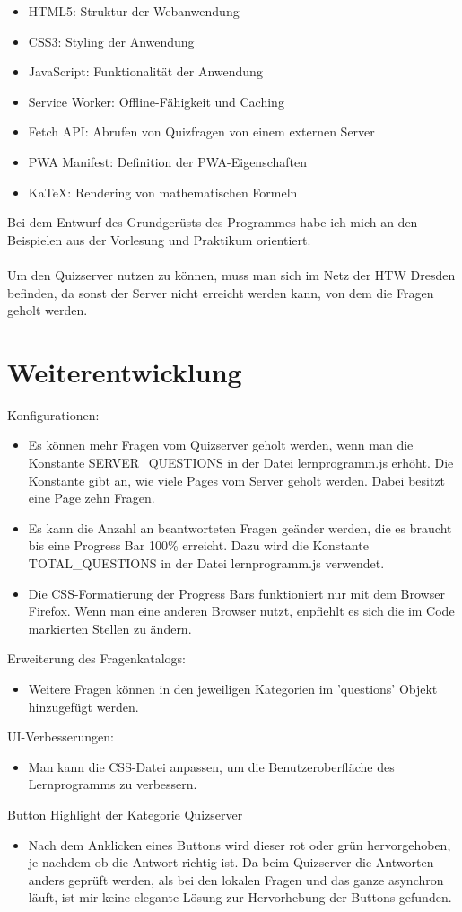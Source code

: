 \documentclass{article}
\begin{document}
\begin{itemize}
  \item HTML5: Struktur der Webanwendung
  \item CSS3: Styling der Anwendung
  \item JavaScript: Funktionalität der Anwendung
  \item Service Worker: Offline-Fähigkeit und Caching
  \item Fetch API: Abrufen von Quizfragen von einem externen Server
  \item PWA Manifest: Definition der PWA-Eigenschaften
  \item KaTeX: Rendering von mathematischen Formeln
\end{itemize}
Bei dem Entwurf des Grundgerüsts des Programmes habe ich mich an den Beispielen aus der Vorlesung und Praktikum orientiert.\\\\
Um den Quizserver nutzen zu können, muss man sich im Netz der HTW Dresden befinden, da sonst der Server nicht erreicht werden
kann, von dem die Fragen geholt werden.
\newpage

\section{Weiterentwicklung}
Konfigurationen:
\begin{itemize}
  \item Es können mehr Fragen vom Quizserver geholt werden, wenn man die Konstante SERVER\_QUESTIONS in der Datei lernprogramm.js erhöht.
  Die Konstante gibt an, wie viele Pages vom Server geholt werden. Dabei besitzt eine Page zehn Fragen.
  \item Es kann die Anzahl an beantworteten Fragen geänder werden, die es braucht bis eine Progress Bar 100\% erreicht. Dazu wird die Konstante
  TOTAL\_QUESTIONS in der Datei lernprogramm.js verwendet.
  \item Die CSS-Formatierung der Progress Bars funktioniert nur mit dem Browser Firefox. Wenn man eine anderen Browser nutzt, enpfiehlt es sich
  die im Code markierten Stellen zu ändern.
\end{itemize}
Erweiterung des Fragenkatalogs:
\begin{itemize}
  \item Weitere Fragen können in den jeweiligen Kategorien im 'questions' Objekt hinzugefügt werden.
\end{itemize}
UI-Verbesserungen:
\begin{itemize}
  \item Man kann die CSS-Datei anpassen, um die Benutzeroberfläche des Lernprogramms zu verbessern.
\end{itemize}
Button Highlight der Kategorie Quizserver
\begin{itemize}
  \item Nach dem Anklicken eines Buttons wird dieser rot oder grün hervorgehoben, je nachdem ob die Antwort richtig ist. Da beim Quizserver die Antworten
  anders geprüft werden, als bei den lokalen Fragen und das ganze asynchron läuft, ist mir keine elegante Lösung zur Hervorhebung der Buttons gefunden.
\end{itemize}
\end{document}
